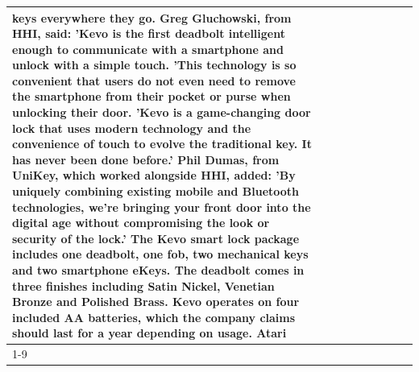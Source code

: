 \begin{table}[H]
\begin{tabular}{lllrlllll}
keys everywhere they go. Greg Gluchowski, from HHI, said: 'Kevo is the first deadbolt intelligent enough to communicate with a smartphone and unlock with a simple touch. 'This technology is so convenient that users do not even need to remove the smartphone from their pocket or purse when unlocking their door. 'Kevo is a game-changing door lock that uses modern technology and the convenience of touch to evolve the traditional key. It has never been done before.' Phil Dumas, from UniKey, which worked alongside HHI, added: 'By uniquely combining existing mobile and Bluetooth technologies, we’re bringing your front door into the digital age without compromising the look or security of the lock.' The Kevo smart lock package includes one deadbolt, one fob, two mechanical keys and two smartphone eKeys. The deadbolt comes in three finishes including Satin Nickel, Venetian Bronze and Polished Brass. Kevo operates on four included AA batteries, which the company claims should last for a year depending on usage. Atari \\
\cline{1-9}

\end{tabular}
\end{table}
